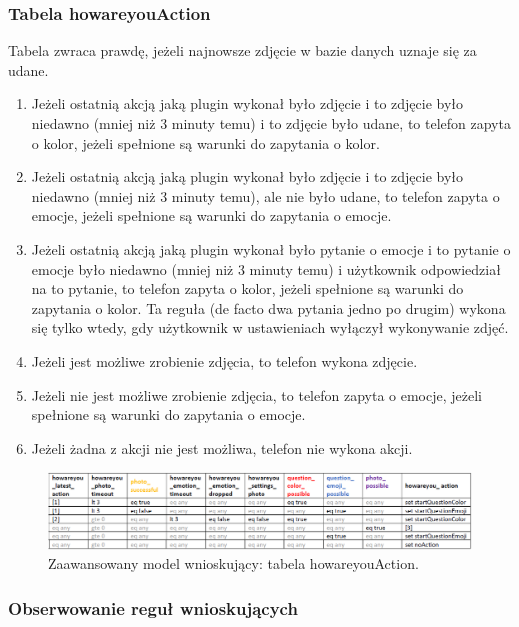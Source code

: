 \subsubsection{Tabela howareyouAction}

Tabela zwraca prawdę, jeżeli najnowsze zdjęcie w bazie danych uznaje się za udane. 
\begin{enumerate}
\item Jeżeli ostatnią akcją jaką plugin wykonał było zdjęcie i to zdjęcie było niedawno (mniej niż 3 minuty temu) i to zdjęcie było udane, to telefon zapyta o kolor, jeżeli spełnione są warunki do zapytania o kolor.
\item Jeżeli ostatnią akcją jaką plugin wykonał było zdjęcie i to zdjęcie było niedawno (mniej niż 3 minuty temu), ale nie było udane, to telefon zapyta o emocje, jeżeli spełnione są warunki do zapytania o emocje.
\item Jeżeli ostatnią akcją jaką plugin wykonał było pytanie o emocje i to pytanie o emocje było niedawno (mniej niż 3 minuty temu) i użytkownik odpowiedział na to pytanie, to telefon zapyta o kolor, jeżeli spełnione są warunki do zapytania o kolor. Ta reguła (de facto dwa pytania jedno po drugim) wykona się tylko wtedy, gdy użytkownik w ustawieniach wyłączył wykonywanie zdjęć. 
\item Jeżeli jest możliwe zrobienie zdjęcia, to telefon wykona zdjęcie. 
\item Jeżeli nie jest możliwe zrobienie zdjęcia, to telefon zapyta o emocje, jeżeli spełnione są warunki do zapytania o emocje.
\item Jeżeli żadna z akcji nie jest możliwa, telefon nie wykona akcji.
\end{enumerate}

\begin{figure}[H]
\centering
\includegraphics[scale=0.8]{rozdzial4/HMR_howareyouAction.png}
\caption{Zaawansowany model wnioskujący: tabela howareyouAction.}
\end{figure}


\subsubsection{Obserwowanie reguł wnioskujących}

